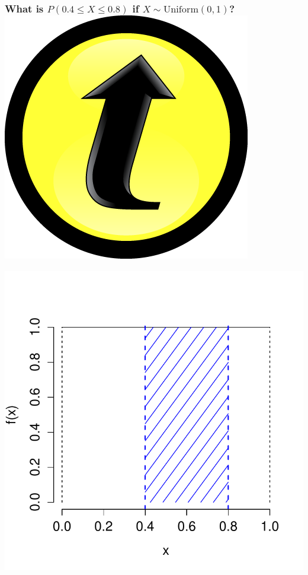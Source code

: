 \documentclass[handout]{beamer}
\begin{document}
\begin{frame}
\frametitle{What is $P(0.4 \leq X \leq 0.8)$ if $X\sim \mbox{Uniform}(0,1)$? \hfill \includegraphics[scale = 0.05]{./images/clicker}}
\centering
	\includegraphics[scale = 0.6]{./images/uniform_density_interval}


\end{frame}
\end{document}
